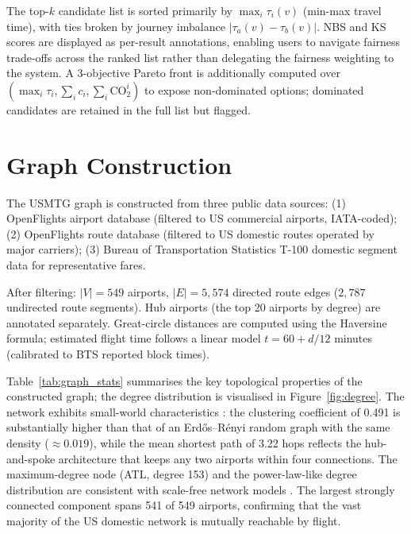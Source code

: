 \documentclass[review]{elsarticle}
\begin{document}
The top-$k$ candidate list is sorted primarily by $\max_i \tau_i(v)$ (min-max travel time), with ties broken by journey imbalance $|\tau_a(v) - \tau_b(v)|$.
NBS and KS scores are displayed as per-result annotations, enabling users to navigate fairness trade-offs across the ranked list rather than delegating the fairness weighting to the system.
A 3-objective Pareto front is additionally computed over $(\max_i \tau_i, \sum_i c_i, \sum_i \text{CO}_2^i)$ to expose non-dominated options; dominated candidates are retained in the full list but flagged.

\section{Graph Construction}

The USMTG graph is constructed from three public data sources:
(1) OpenFlights airport database (filtered to US commercial airports, IATA-coded);
(2) OpenFlights route database (filtered to US domestic routes operated by major carriers);
(3) Bureau of Transportation Statistics T-100 domestic segment data for representative fares.

After filtering: $|V| = 549$ airports, $|E| = 5{,}574$ directed route edges ($2{,}787$ undirected route segments).
Hub airports (the top 20 airports by degree) are annotated separately.
Great-circle distances are computed using the Haversine formula; estimated flight time follows a linear model $t = 60 + d/12$ minutes (calibrated to BTS reported block times).

Table~\ref{tab:graph_stats} summarises the key topological properties of the constructed graph; the degree distribution is visualised in Figure~\ref{fig:degree}.
The network exhibits small-world characteristics \cite{watts1998,newman2003}: the clustering coefficient of 0.491 is substantially higher than that of an Erdős--Rényi random graph with the same density ($\approx 0.019$), while the mean shortest path of 3.22 hops reflects the hub-and-spoke architecture that keeps any two airports within four connections.
The maximum-degree node (ATL, degree 153) and the power-law-like degree distribution are consistent with scale-free network models \cite{barabasi1999}.
The largest strongly connected component spans 541 of 549 airports, confirming that the vast majority of the US domestic network is mutually reachable by flight.
\end{document}
